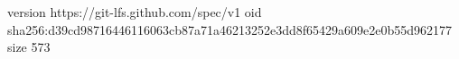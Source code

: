 version https://git-lfs.github.com/spec/v1
oid sha256:d39cd98716446116063cb87a71a46213252e3dd8f65429a609e2e0b55d962177
size 573

